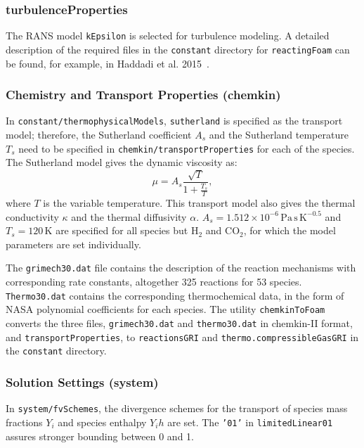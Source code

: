 \subsubsection*{turbulenceProperties}
The RANS model \texttt{kEpsilon} is selected for turbulence modeling. A detailed description of the required files in the \texttt{constant} directory for \texttt{reactingFoam} can be found, for example, in Haddadi et al. 2015~\cite{ref9}.

\subsubsection*{Chemistry and Transport Properties (chemkin)}
In \texttt{constant/thermophysicalModels}, \texttt{sutherland} is specified as the transport model; therefore, the Sutherland coefficient $A_s$ and the Sutherland temperature $T_s$ need to be specified in \texttt{chemkin/transportProperties} for each of the species. The Sutherland model gives the dynamic viscosity as:
\begin{equation}
\mu = A_s \frac{\sqrt{T}}{1 + \frac{T_s}{T}},
\end{equation}
where $T$ is the variable temperature. This transport model also gives the thermal conductivity $\kappa$ and the thermal diffusivity $\alpha$. $A_s = 1.512 \times 10^{-6} \, \mathrm{Pa \, s \, K^{-0.5}}$ and $T_s = 120 \, \mathrm{K}$ are specified for all species but $\mathrm{H}_2$ and $\mathrm{CO}_2$, for which the model parameters are set individually.

The \texttt{grimech30.dat} file contains the description of the reaction mechanisms with corresponding rate constants, altogether 325 reactions for 53 species. \texttt{Thermo30.dat} contains the corresponding thermochemical data, in the form of NASA polynomial coefficients for each species. The utility \texttt{chemkinToFoam} converts the three files, \texttt{grimech30.dat} and \texttt{thermo30.dat} in chemkin-II format, and \texttt{transportProperties}, to \texttt{reactionsGRI} and \texttt{thermo.compressibleGasGRI} in the \texttt{constant} directory.

\subsubsection*{Solution Settings (system)}
In \texttt{system/fvSchemes}, the divergence schemes for the transport of species mass fractions $Y_i$ and species enthalpy $Y_i h$ are set. The \texttt{'01'} in \texttt{limitedLinear01} assures stronger bounding between 0 and 1.

